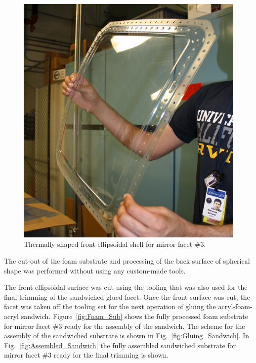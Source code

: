 \begin{figure}[ht]
    \centering
    \includegraphics[width=0.90\linewidth]{images/Front_Shell.png}
    \caption{Thermally shaped front ellipsoidal shell for mirror facet \#3.}
    \label{fig:Shell}
\end{figure}

The cut-out of the foam substrate and processing of the back surface of spherical shape was performed without
using any custom-made tools.%

The front ellipsoidal surface was cut using the tooling that was also used for the final trimming of the sandwiched
glued facet. Once the front surface was cut, the facet was taken off the tooling set for the next operation of
gluing the acryl-foam-acryl sandwich. Figure~\ref{fig:Foam_Sub} shows the fully processed foam substrate for
mirror facet \#3 ready for the assembly of the sandwich. The scheme for the assembly of the sandwiched
substrate is shown in Fig.~\ref{fig:Gluing_Sandwich}. In Fig.~\ref{fig:Assembled_Sandwich} the fully assembled
sandwiched substrate for mirror facet \#3 ready for the final trimming is shown. 

